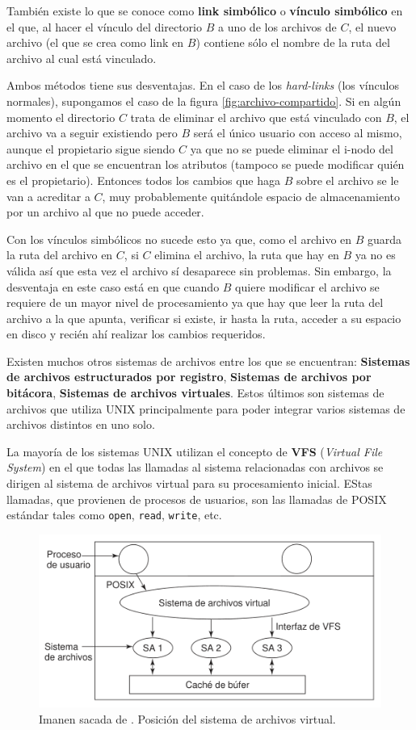 \documentclass[12pt]{article}
\begin{document}
  También existe lo que se conoce como \textbf{link simbólico} o \textbf{vínculo simbólico} en el que, al hacer el vínculo del directorio $ B $ a uno de los archivos de $ C $, el nuevo archivo (el que se crea como link en $ B $) contiene sólo el nombre de la ruta del archivo al cual está vinculado. 
  
  Ambos métodos tiene sus desventajas. En el caso de los \textit{hard-links} (los vínculos normales), supongamos el caso de la figura \ref{fig:archivo-compartido}. Si en algún momento el directorio $ C $ trata de eliminar el archivo que está vinculado con $ B $, el archivo va a seguir existiendo pero $ B $ será el único usuario con acceso al mismo, aunque el propietario sigue siendo $ C $ ya que no se puede eliminar el i-nodo del archivo en el que se encuentran los atributos (tampoco se puede modificar quién es el propietario). Entonces todos los cambios que haga $ B $ sobre el archivo se le van a acreditar a $ C $, muy probablemente quitándole espacio de almacenamiento por un archivo al que no puede acceder.

  Con los vínculos simbólicos no sucede esto ya que, como el archivo en $ B $ guarda la ruta del archivo en $ C $, si $ C $ elimina el archivo, la ruta que hay en $ B $ ya no es válida así que esta vez el archivo sí desaparece sin problemas. Sin embargo, la desventaja en este caso está en que cuando $ B $ quiere modificar el archivo se requiere de un mayor nivel de procesamiento ya que hay que leer la ruta del archivo a la que apunta, verificar si existe, ir hasta la ruta, acceder a su espacio en disco y recién ahí realizar los cambios requeridos.

  Existen muchos otros sistemas de archivos entre los que se encuentran: \textbf{Sistemas de archivos estructurados por registro}, \textbf{Sistemas de archivos por bitácora}, \textbf{Sistemas de archivos virtuales}. Estos últimos son sistemas de archivos que utiliza UNIX principalmente para poder integrar varios sistemas de archivos distintos en uno solo. 

  La mayoría de los sistemas UNIX utilizan el concepto de \textbf{VFS} (\textit{Virtual File System}) en el que todas las llamadas al sistema relacionadas con archivos se dirigen al sistema de archivos virtual para su procesamiento inicial. EStas llamadas, que provienen de procesos de usuarios, son las llamadas de POSIX estándar tales como \verb|open|, \verb|read|, \verb|write|, etc.

  \begin{figure}[H]
    \centering
    \includegraphics[width=0.7\linewidth]{imagenes/vfs.png}
    \caption{Imanen sacada de \parencite{tanenbaum}. Posición del sistema de archivos virtual.}
    \label{fig:vfs}
  \end{figure}

  
  


  

  \newpage
  \printbibliography
\end{document}
